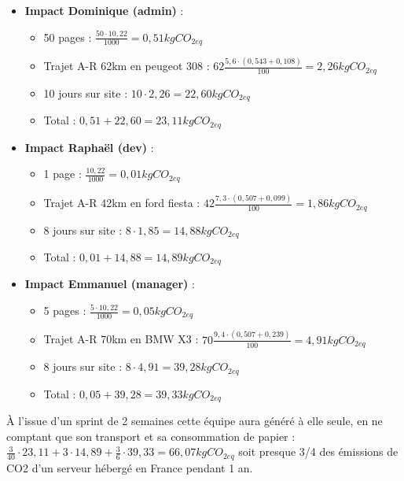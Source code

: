 \begin{itemize}
\tightlist
\item
  \textbf{Impact Dominique (admin)} :

  \begin{itemize}
  \tightlist
  \item
    50 pages : \(\frac{50 \cdot 10,22}{1000} = 0,51 kgCO_{2eq}\)
  \item
    Trajet A-R 62km en peugeot 308 :
    \(62 \frac{5,6 \cdot (0,543 + 0,108)}{100} = 2,26 kgCO_{2eq}\)
  \item
    10 jours sur site : \(10 \cdot 2,26 = 22,60 kgCO_{2eq}\)
  \item
    Total : \(0,51 + 22,60 = 23,11 kgCO_{2eq}\)
  \end{itemize}
\item
  \textbf{Impact Raphaël (dev)} :

  \begin{itemize}
  \tightlist
  \item
    1 page : \(\frac{10,22}{1000} = 0,01 kgCO_{2eq}\)
  \item
    Trajet A-R 42km en ford fiesta :
    \(42 \frac{7,3 \cdot (0,507 + 0,099)}{100} = 1,86 kgCO_{2eq}\)
  \item
    8 jours sur site : \(8 \cdot 1,85 = 14,88 kgCO_{2eq}\)
  \item
    Total : \(0,01 + 14,88 = 14,89 kgCO_{2eq}\)
  \end{itemize}
\item
  \textbf{Impact Emmanuel (manager)} :

  \begin{itemize}
  \tightlist
  \item
    5 pages : \(\frac{5 \cdot 10,22}{1000} = 0,05 kgCO_{2eq}\)
  \item
    Trajet A-R 70km en BMW X3 :
    \(70 \frac{9,4 \cdot (0,507 + 0,239)}{100} = 4,91 kgCO_{2eq}\)
  \item
    8 jours sur site : \(8 \cdot 4,91 = 39,28 kgCO_{2eq}\)
  \item
    Total : \(0,05 + 39,28 = 39,33 kgCO_{2eq}\)
  \end{itemize}
\end{itemize}

À l'issue d'un sprint de 2 semaines cette équipe aura généré à elle
seule, en ne comptant que son transport et sa consommation de papier :
\(\frac{3}{40} \cdot 23,11 + 3 \cdot 14,89 + \frac{3}{6} \cdot 39,33 = 66,07 kgCO_{2eq}\)
soit presque 3/4 des émissions de CO2 d'un serveur hébergé en France
pendant 1 an.

